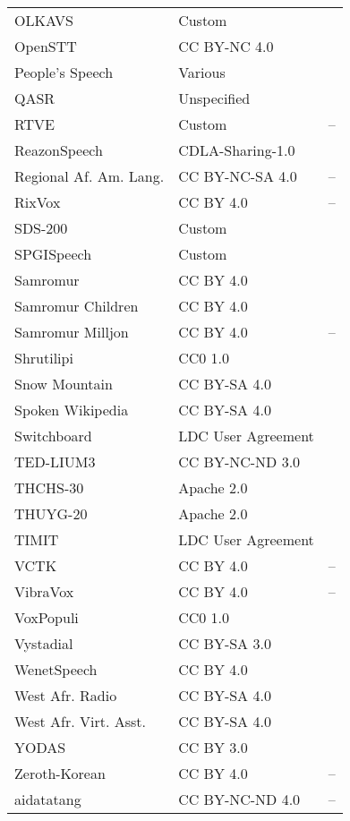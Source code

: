 \begin{longtable}{p{5cm}|p{5cm}|p{5cm}}
OLKAVS & Custom & \autocite{parkOLKAVSOpenLargeScale2023} \\
OpenSTT & CC BY-NC 4.0 & \autocite{andrusenkoExplorationEndtoEndASR2020} \\
People's Speech & Various & \autocite{galvezPeopleSpeechLargeScale2021} \\
QASR & Unspecified & \autocite{mubarakQASRQCRIAljazeera2021} \\
RTVE & Custom & -- \\
ReazonSpeech & CDLA-Sharing-1.0 & \autocite{yinReazonSpeechFreeMassive2023} \\
Regional Af. Am. Lang. & CC BY-NC-SA 4.0 & -- \\
RixVox & CC BY 4.0 & -- \\
SDS-200 & Custom & \autocite{plussSDS200SwissGerman2022} \\
SPGISpeech & Custom & \autocite{oneillSPGISpeech000Hours2021} \\
Samromur & CC BY 4.0 & \autocite{mollbergSamromurCrowdsourcingData2020} \\
Samromur Children & CC BY 4.0 & \autocite{hernandezmenaSamromurChildrenIcelandic2022} \\
Samromur Milljon & CC BY 4.0 & -- \\
Shrutilipi & CC0 1.0 & \autocite{bhogaleEffectivenessMiningAudio2022} \\
Snow Mountain & CC BY-SA 4.0 & \autocite{rajuSnowMountainDataset2023} \\
Spoken Wikipedia & CC BY-SA 4.0 & \autocite{baumannSpokenWikipediaCorpus2019} \\
Switchboard & LDC User Agreement & \autocite{godfreySWITCHBOARDTelephoneSpeech1992} \\
TED-LIUM3 & CC BY-NC-ND 3.0 & \autocite{hernandezTEDLIUMTwiceMuch2018} \\
THCHS-30 & Apache 2.0 & \autocite{wangTHCHS30FreeChinese2015} \\
THUYG-20 & Apache 2.0 & \autocite{roziOpenFreeDatabase2015} \\
TIMIT & LDC User Agreement & \autocite{garofolojohns.TIMITAcousticPhoneticContinuous1993} \\
VCTK & CC BY 4.0 & -- \\
VibraVox & CC BY 4.0 & -- \\
VoxPopuli & CC0 1.0 & \autocite{wangVoxPopuliLargeScaleMultilingual2021} \\
Vystadial & CC BY-SA 3.0 & \autocite{korvasFreeEnglishCzech2014} \\
WenetSpeech & CC BY 4.0 & \autocite{zhangWenetSpeech10000Hours2022} \\
West Afr. Radio & CC BY-SA 4.0 & \autocite{doumbouyaUsingRadioArchives2021} \\
West Afr. Virt. Asst. & CC BY-SA 4.0 & \autocite{doumbouyaUsingRadioArchives2021} \\
YODAS & CC BY 3.0 & \autocite{liYodasYoutubeOrientedDataset2023} \\
Zeroth-Korean & CC BY 4.0 & -- \\
aidatatang & CC BY-NC-ND 4.0 & -- \\
\end{longtable}